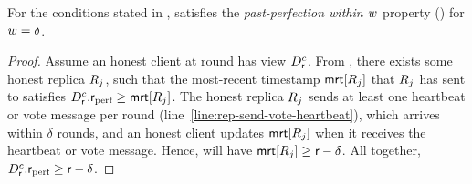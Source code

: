 \begin{lemma}\label{lem:past-perfection-liveness}
	For the conditions stated in ,  satisfies the \emph{past-perfection within $w$} property () for $w = \delta$.
\end{lemma}
\begin{proof}
	Assume an honest client \client at round \round has view $D_{\textsf{r}}^{c}$.
	From , there exists some honest replica $R_j$, such that the most-recent timestamp $\textsf{mrt}[R_j]$ that $R_j$ has sent to \client satisfies $D_{\textsf{r}}^{c}.\textsf{r}_\text{perf} \geq \textsf{mrt}[R_j]$.
	The honest replica $R_j$ sends at least one heartbeat or vote message per round (line~\ref{line:rep-send-vote-heartbeat}), which arrives within $\delta$ rounds, and an honest client updates $\textsf{mrt}[R_j]$ when it receives the heartbeat or vote message.
	Hence, \client will have $\textsf{mrt}[R_j] \geq \textsf{r} - \delta$.
	All together, $D_{\textsf{r}}^{c}.\textsf{r}_\text{perf} \geq \textsf{r} - \delta$.
\end{proof}

